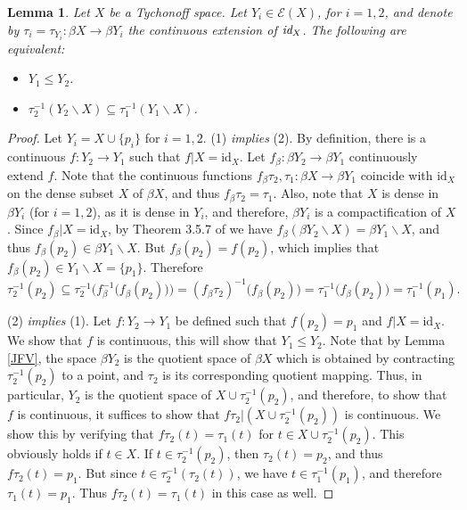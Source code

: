 \documentclass{amsart}
\newtheorem{lemma}[theorem]{Lemma}
\theoremstyle{definition}
\theoremstyle{remark}
\theoremstyle{notation}
\numberwithin{equation}{section}
\begin{document}
\begin{lemma}\label{DFH}
Let $X$ be a Tychonoff space. Let $Y_i\in{\mathscr E}(X)$, for $i=1,2$, and denote by $\tau_i=\tau_{Y_i}:\beta X\rightarrow \beta Y_i$ the continuous
extension of $\mbox{\em id}_X$. The following are equivalent:
\begin{itemize}
\item[\rm(1)] $Y_1\leq Y_2$.
\item[\rm(2)] $\tau^{-1}_2(Y_2\backslash X)\subseteq\tau^{-1}_1(Y_1\backslash X)$.
\end{itemize}
\end{lemma}

\begin{proof}
Let $Y_i=X\cup\{p_i\}$ for $i=1,2$.  (1) {\em  implies} (2).  By definition, there is a continuous
$f:Y_2\rightarrow Y_1$ such that $f|X= \mbox{id}_X$. Let $f_\beta:\beta Y_2\rightarrow \beta Y_1$ continuously  extend $f$. Note that the continuous
functions $f_\beta\tau_2,\tau_1:\beta X\rightarrow \beta Y_1$ coincide  with $\mbox{id}_X$ on the dense subset $X$ of $\beta X$, and thus
$f_\beta\tau_2= \tau_1$. Also, note that $X$ is dense in $\beta Y_i$ (for $i=1,2$), as it is  dense in $Y_i$, and therefore,  $\beta Y_i$ is a compactification
of $X$. Since $f_\beta|X=\mbox{id}_X$, by Theorem 3.5.7 of \cite{E} we have $f_\beta(\beta Y_2\backslash X)=\beta Y_1\backslash X$, and thus $f_\beta(p_2)\in \beta Y_1\backslash X$. But $f_\beta(p_2)=f(p_2)$, which implies that $f_\beta(p_2)\in Y_1\backslash X=\{p_1\}$.  Therefore
\[\tau^{-1}_2(p_2)\subseteq\tau^{-1}_2\big(f_\beta^{-1}\big(f_\beta(p_2)\big)\big)=(f_\beta\tau_2)^{-1}\big(f_\beta(p_2)\big)
=\tau_1^{-1}\big(f_\beta(p_2)\big)=\tau_1^{-1}(p_1).\]

(2) {\em  implies} (1).  Let $f:Y_2\rightarrow Y_1$ be defined  such that $f(p_2)=p_1$ and $f|X=\mbox{id}_X$. We show that $f$ is continuous, this will show that $Y_1\leq Y_2$. Note that by Lemma \ref{JFV}, the space $\beta Y_2$ is the quotient space of $\beta X$ which is  obtained by contracting  $\tau^{-1}_2(p_2)$ to a point, and $\tau_2$ is its corresponding quotient mapping. Thus, in particular, $Y_2$ is the quotient space of $X\cup \tau^{-1}_2 (p_2)$, and therefore, to show that $f$ is continuous, it suffices to show that $f\tau_2|(X\cup\tau^{-1}_2 (p_2))$ is continuous. We show this by verifying that $f\tau_2(t)=\tau_1(t)$ for  $t\in X\cup\tau^{-1}_2 (p_2)$. This obviously holds if $t\in X$. If $t\in \tau^{-1}_2 (p_2)$, then $\tau_2(t)=p_2$, and thus $f\tau_2 (t)=p_1$. But since $t\in \tau^{-1}_2(\tau_2 (t))$, we have $t\in \tau^{-1}_1(p_1)$, and therefore $\tau_1(t)=p_1$. Thus $f\tau_2(t)=\tau_1(t)$ in this case as well.
\end{proof}
\end{document}
